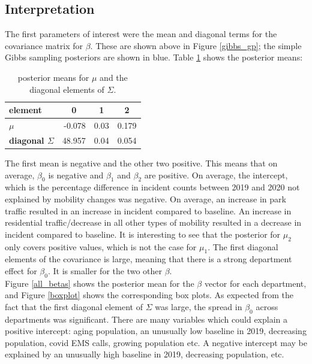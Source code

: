 \documentclass[paper=a4, fontsize=11pt]{scrartcl}
\begin{document}
\newpage
\subsection{Interpretation}
The first parameters of interest were the mean and diagonal terms for the covariance matrix for $\beta$. These are shown above in Figure \ref{gibbs_gp}; the simple Gibbs sampling posteriors are shown in blue. Table \ref{tab2} shows the posterior means:\\


\begin{table}[!htb]
\centering
\begin{tabular}{|l|r|r|r|}
\hline
\textbf{element}           & \multicolumn{1}{c|}{\textbf{0}} & \multicolumn{1}{c|}{\textbf{1}} & \multicolumn{1}{c|}{\textbf{2}} \\ \hline
\textbf{$\mu$}             & -0.078	& 0.03 &	0.179                          \\ \hline
\textbf{diagonal $\Sigma$} & 48.957	& 0.04 & 	0.054                         \\ \hline

\end{tabular}
\caption{posterior means for $\mu$ and the diagonal elements of $\Sigma$.}
\label{tab2}
\end{table}

The first mean is negative and the other two positive. This means that on average, $\beta_0$ is negative and $\beta_1$  and $\beta_2$ are positive. On average, the intercept, which is the percentage difference in incident counts between 2019 and 2020 not explained by mobility changes was negative. On average, an increase in park traffic resulted in an increase in incident compared to baseline. An increase in residential traffic/decrease in all other types of mobility resulted in a decrease in incident compared to baseline.  It is interesting to see that the posterior for $\mu_{2}$ only covers positive values, which is not the case for $\mu_{1}$. The first diagonal elements of the covariance is large, meaning that there is a strong department effect for $\beta_0$. It is smaller for the two other $\beta$. \\

Figure \ref{all_betas} shows the posterior mean for the $\beta$ vector for each department, and Figure \ref{boxplot} shows the corresponding box plots. As expected from the fact that the first diagonal element of $\Sigma$ was large, the spread in $\beta_0$ across departments was significant. There are many variables which could explain a positive intercept: aging population, an unusually low baseline in 2019, decreasing population, covid EMS calls, growing population etc. A negative intercept may be explained by an unusually high baseline in 2019, decreasing population, etc. \\
\end{document}
